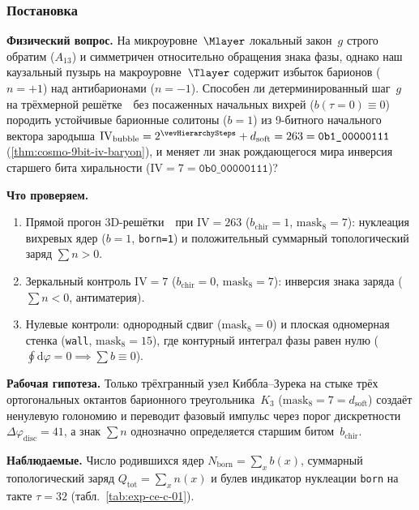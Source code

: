 \label{exp:cec01}

\subsubsection*{Постановка}
\textbf{Физический вопрос.}
На микроуровне~$\Mlayer$ локальный закон~$g$ строго обратим ($A_{13}$) и симметричен относительно обращения знака фазы, однако наш каузальный пузырь на макроуровне~$\Tlayer$ содержит избыток барионов ($n=+1$) над антибарионами ($n=-1$).
Способен ли детерминированный шаг~$g$ на трёхмерной решётке~\latGCKshort\ без посаженных начальных вихрей ($b(\tau=0)\equiv 0$) породить устойчивые барионные солитоны ($b=1$) из 9-битного начального вектора зародыша $\mathrm{IV}_{\mathrm{bubble}} = 2^{\vevHierarchySteps} + d_{\mathrm{soft}} = 263 = \texttt{0b1\_00000111}$ (\cref{thm:cosmo-9bit-iv-baryon}), и меняет ли знак рождающегося мира инверсия старшего бита хиральности ($\mathrm{IV} = 7 = \texttt{0b0\_00000111}$)?

\textbf{Что проверяем.}
\begin{enumerate}[label=\textbf{(\alph*)},leftmargin=*,itemsep=0.25em]
\item Прямой прогон 3D-решётки~\latGCKshort\ при $\mathrm{IV} = 263$ ($b_{\mathrm{chir}}=1$, $\mathrm{mask}_8 = 7$): нуклеация вихревых ядер ($b=1$, \texttt{born=1}) и положительный суммарный топологический заряд $\sum n > 0$.
\item Зеркальный контроль $\mathrm{IV} = 7$ ($b_{\mathrm{chir}}=0$, $\mathrm{mask}_8 = 7$): инверсия знака заряда ($\sum n < 0$, антиматерия).
\item Нулевые контроли: однородный сдвиг ($\mathrm{mask}_8 = 0$) и плоская одномерная стенка (\texttt{wall}, $\mathrm{mask}_8 = 15$), где контурный интеграл фазы равен нулю ($\oint\mathrm{d}\varphi = 0 \implies \sum b \equiv 0$).
\end{enumerate}

\textbf{Рабочая гипотеза.}
Только трёхгранный узел Киббла--Зурека на стыке трёх ортогональных октантов барионного треугольника~$K_3$ ($\mathrm{mask}_8 = 7 = d_{\mathrm{soft}}$) создаёт ненулевую голономию и переводит фазовый импульс через порог дискретности $\Delta\varphi_{\mathrm{disc}} = 41$, а знак $\sum n$ однозначно определяется старшим битом~$b_{\mathrm{chir}}$.

\textbf{Наблюдаемые.}
Число родившихся ядер $N_{\mathrm{born}} = \sum_x b(x)$, суммарный топологический заряд $Q_{\mathrm{tot}} = \sum_x n(x)$ и булев индикатор нуклеации \texttt{born} на такте $\tau = 32$ (табл.~\ref{tab:exp-ce-c-01}).

